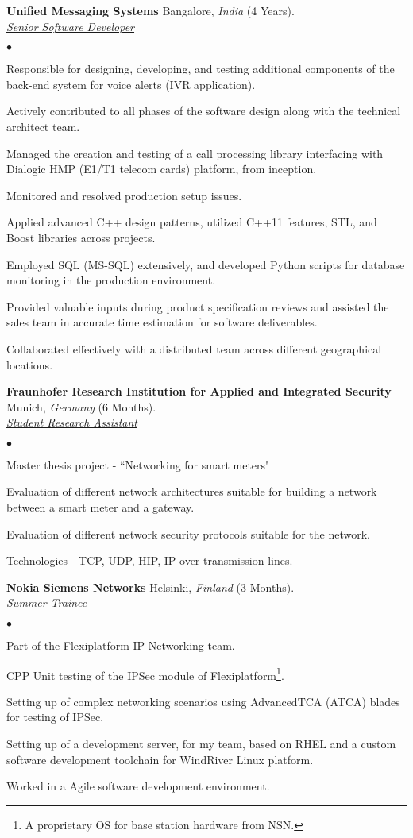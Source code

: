 \documentclass[a4paper]{article}
\newcommand{\employer}[4]{{ \textbf{#1} #2  (#3).\\ \underline{\emph{#4}}\\  }}
\newenvironment{achievements}{\begin{list}{$\bullet$}{\topsep 0pt \itemsep -2pt}}{\vspace*{4pt}\end{list}}
\begin{document}
\break
\employer{Unified Messaging Systems} {Bangalore, \textit{India}} {4 Years} {Senior Software Developer}
	\begin{achievements}
	  \item Responsible for designing, developing, and testing additional components of the back-end system for voice alerts (IVR application).
	  \item Actively contributed to all phases of the software design along with the technical architect team.
	  \item Managed the creation and testing of a call processing library interfacing with Dialogic HMP (E1/T1 telecom cards) platform, from inception.
	  \item Monitored and resolved production setup issues.
	  \item Applied advanced C++ design patterns, utilized C++11 features, STL, and Boost libraries across projects.
	  \item Employed SQL (MS-SQL) extensively, and developed Python scripts for database monitoring in the production environment.
	  \item Provided valuable inputs during product specification reviews and assisted the sales team in accurate time estimation for software deliverables.
	  \item Collaborated effectively with a distributed team across different geographical locations.
	\end{achievements}

\employer{Fraunhofer Research Institution for Applied and Integrated Security} {Munich, \textit{Germany}} {6 Months}{Student Research Assistant}
	\begin{achievements}
	  \item Master thesis project - ``Networking for smart meters"
	  \item Evaluation of different network architectures suitable for building a network between a smart meter and a gateway.
	  \item Evaluation of different network security protocols suitable for the network.
          \item Technologies - TCP, UDP, HIP, IP over transmission lines.
	\end{achievements}

\employer{Nokia Siemens Networks}{Helsinki, \textit{Finland}}{3 Months}{Summer Trainee}
	\begin{achievements}
          \item Part of the Flexiplatform IP Networking team.
	  \item CPP Unit testing of the IPSec module of Flexiplatform\footnote[1]{A proprietary OS for base station hardware from NSN.}.
	  \item Setting up of complex networking scenarios using AdvancedTCA (ATCA) blades for testing of IPSec.
	  \item Setting up of a development server, for my team, based on RHEL and a custom software development toolchain for WindRiver Linux platform.
	  \item Worked in a Agile software development environment.
	\end{achievements}
\end{document}

